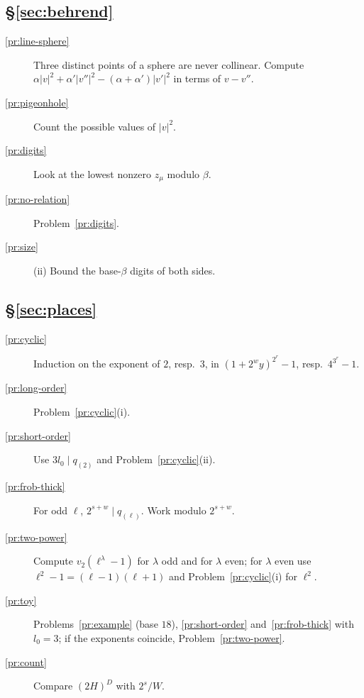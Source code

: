 \documentclass[reqno]{amsart}
\theoremstyle{definition}
\theoremstyle{plain}
\begin{document}
\subsection*{\S\ref{sec:behrend}}
\begin{description}
\item[\ref{pr:line-sphere}] Three distinct points of a sphere are never collinear.  Compute \(\alpha\lvert v\rvert^2 + \alpha'\lvert v''\rvert^2 - (\alpha+\alpha')\lvert v'\rvert^2\) in terms of \(v - v''\).
\item[\ref{pr:pigeonhole}] Count the possible values of \(\lvert v\rvert^2\).
\item[\ref{pr:digits}] Look at the lowest nonzero \(z_\mu\) modulo \(\beta\).
\item[\ref{pr:no-relation}] Problem~\ref{pr:digits}.
\item[\ref{pr:size}] (ii) Bound the base-\(\beta\) digits of both sides.
\end{description}

\subsection*{\S\ref{sec:places}}
\begin{description}
\item[\ref{pr:cyclic}] Induction on the exponent of \(2\), resp.\ \(3\), in \((1+2^wy)^{2^r} - 1\), resp.\ \(4^{3^r} - 1\).
\item[\ref{pr:long-order}] Problem~\ref{pr:cyclic}(i).
\item[\ref{pr:short-order}] Use \(3l_0 \mid q_{(2)}\) and Problem~\ref{pr:cyclic}(ii).
\item[\ref{pr:frob-thick}] For odd \(\ell\), \(2^{s+w} \mid q_{(\ell)}\).  Work modulo \(2^{s+w}\).
\item[\ref{pr:two-power}] Compute \(v_2(\ell^\lambda - 1)\) for \(\lambda\) odd and for \(\lambda\) even; for \(\lambda\) even use \(\ell^2 - 1 = (\ell-1)(\ell+1)\) and Problem~\ref{pr:cyclic}(i) for \(\ell^2\).
\item[\ref{pr:toy}] Problems~\ref{pr:example} (base \(18\)), \ref{pr:short-order} and~\ref{pr:frob-thick} with \(l_0 = 3\); if the exponents coincide, Problem~\ref{pr:two-power}.
\item[\ref{pr:count}] Compare \((2H)^D\) with \(2^s/W\).
\end{description}
\end{document}

